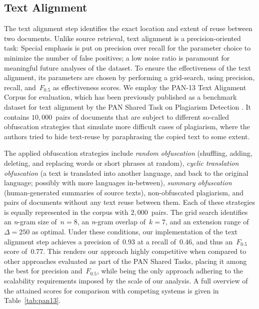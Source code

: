 \subsection*{Text Alignment}

The text alignment step identifies the exact location and extent of reuse between two documents. Unlike source retrieval, text alignment is a precision-oriented task: Special emphasis is put on precision over recall for the parameter choice to minimize the number of false positives; a low noise ratio is paramount for meaningful future analyses of the dataset. To ensure the effectiveness of the text alignment, its parameters are chosen by performing a grid-search, using precision, recall, and~$F_{0.5}$ as effectiveness scores. We employ the PAN-13 Text Alignment Corpus for evaluation, which has been previously published as a benchmark dataset for text alignment by the PAN Shared Task on Plagiarism Detection \cite{potthast:2013}. It contains $10,000$~pairs of documents that are subject to different so-called obfuscation strategies that simulate more difficult cases of plagiarism, where the authors tried to hide text-reuse by paraphrasing the copied text to some extent. 

The applied obfuscation strategies include \emph{random obfuscation} (shuffling, adding, deleting, and replacing words or short phrases at random), \emph{cyclic translation obfuscation} (a text is translated into another language, and back to the original language; possibly with more languages in-between), \emph{summary obfuscation} (human-generated summaries of source texts), non-obfuscated plagiarism, and pairs of documents without any text reuse between them. Each of these strategies is equally represented in the corpus with $2,000$~pairs. The grid search identifies an \emph{n}-gram size of~$n = 8$, an \emph{n}-gram overlap of~$k = 7$, and an extension range of~$\Delta = 250$ as optimal. Under these conditions, our implementation of the text alignment step achieves a precision of~0.93 at a recall of~0.46, and thus an~$F_{0.5}$ score of~0.77. This renders our approach highly competitive when compared to other approaches evaluated as part of the PAN Shared Tasks, placing it among the best for precision and~$F_{0.5}$, while being the only approach adhering to the scalability requirements imposed by the scale of our analysis. A full overview of the attained scores for comparison with competing systems is given in Table~\ref{tab:pan13}.

